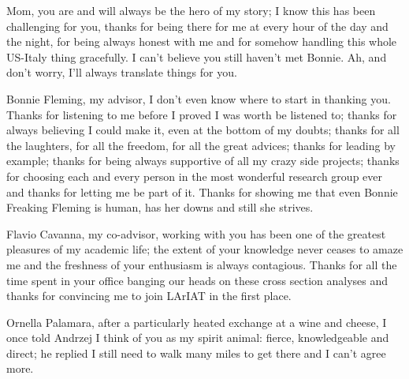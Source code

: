 \documentclass[letterpaper,12pt]{yalephd}
\begin{document}



Mom, you are and will always be the hero of my story; I know this has been challenging for you, thanks for being there for me at every hour of the day and the night, for being always honest with me and for somehow handling this whole US-Italy thing gracefully. I can't believe you still haven't met Bonnie. Ah, and don't worry, I'll always translate things for you. 

Bonnie Fleming, my advisor, I don't even know where to start in thanking you. Thanks for listening to me before I proved I was worth be listened to; thanks for always believing I could make it, even at the bottom of my doubts; thanks for all the laughters, for all the freedom, for all the great advices; thanks for leading by example; thanks for being always supportive of all my crazy side projects; thanks for choosing each and every person in the most wonderful research group ever and thanks for letting me be part of it. Thanks for showing me that even Bonnie Freaking Fleming is human, has her downs and still she strives.

Flavio Cavanna, my co-advisor, working with you has been one of the greatest pleasures of my academic life; the extent of your knowledge never ceases to amaze me and the freshness of your enthusiasm is always contagious. Thanks for all the time spent in your office banging our heads on these cross section analyses and thanks for convincing me to join LArIAT in the first place.

Ornella Palamara, after a particularly heated exchange at a wine and cheese, I once told Andrzej I think of you as my spirit animal: fierce, knowledgeable and direct; he replied I still need to walk many miles to get there and I can't agree more.
\end{document}
